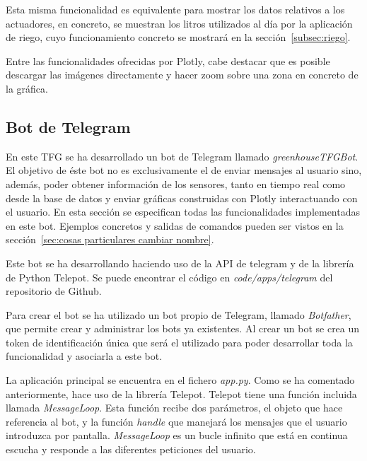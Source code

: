\documentclass[a4paper, 12pt, oneside]{book}
\begin{document}
Esta misma funcionalidad es equivalente para mostrar los datos relativos a los actuadores, en concreto, se muestran los litros utilizados al día por la aplicación de riego, cuyo funcionamiento concreto se mostrará en la sección~\ref{subsec:riego}.


Entre las funcionalidades ofrecidas por Plotly, cabe destacar que es posible descargar las imágenes directamente y hacer zoom sobre una zona en concreto de la gráfica. 
 

\subsection{Bot de Telegram}
\label{bot de telegram}
En este TFG se ha desarrollado un bot de Telegram llamado \textit{greenhouseTFGBot}. El objetivo de éste bot no es exclusivamente el de enviar mensajes al usuario sino, además, poder obtener información de los sensores, tanto en tiempo real como desde la base de datos y enviar gráficas construidas con Plotly interactuando con el usuario. En esta sección se especifican todas las funcionalidades implementadas en este bot. Ejemplos concretos y salidas de comandos pueden ser vistos en la sección~\ref{sec:cosas particulares cambiar nombre}.

Este bot se ha desarrollando haciendo uso de la API de telegram y de la librería de Python Telepot. Se puede encontrar el código en \textit{code/apps/telegram} del repositorio de Github.

Para crear el bot se ha utilizado un bot propio de Telegram, llamado \textit{Botfather}, que permite crear y administrar los bots ya existentes. Al crear un bot se crea un token de identificación única que será el utilizado para poder desarrollar toda la funcionalidad y asociarla a este bot.
 
La aplicación principal se encuentra en el fichero \textit{app.py}. Como se ha comentado anteriormente, hace uso de la librería Telepot. Telepot tiene una función incluida llamada \textit{MessageLoop}. Esta función recibe dos parámetros, el objeto que hace referencia al bot, y la función \textit{handle} que manejará los mensajes que el usuario introduzca por pantalla. \textit{MessageLoop} es un bucle infinito que está en continua escucha y responde a las diferentes peticiones del usuario.
\end{document}
